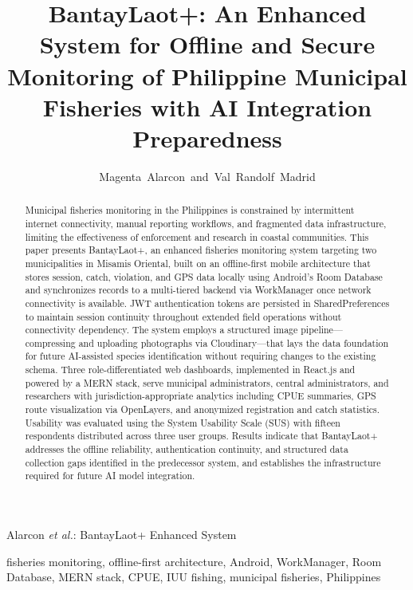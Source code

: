 \documentclass[journal]{IEEEtran}
\begin{document}
\title{BantayLaot+: An Enhanced System for Offline and Secure Monitoring of Philippine
Municipal Fisheries with AI Integration Preparedness}

\author{Magenta~Alarcon~and~Val~Randolf~Madrid}


%
{Alarcon \MakeLowercase{\textit{et al.}}: BantayLaot+ Enhanced System}

\maketitle

\begin{abstract}
Municipal fisheries monitoring in the Philippines is constrained by intermittent
internet connectivity, manual reporting workflows, and fragmented data infrastructure,
limiting the effectiveness of enforcement and research in coastal communities.
This paper presents BantayLaot+, an enhanced fisheries monitoring system targeting two
municipalities in Misamis Oriental, built on an offline-first mobile architecture that
stores session, catch, violation, and GPS data locally using Android's Room Database and
synchronizes records to a multi-tiered backend via WorkManager once network connectivity
is available. JWT authentication tokens are persisted in SharedPreferences to maintain
session continuity throughout extended field operations without connectivity dependency.
The system employs a structured image pipeline---compressing and uploading photographs
via Cloudinary---that lays the data foundation for future AI-assisted species
identification without requiring changes to the existing schema. Three
role-differentiated web dashboards, implemented in React.js and powered by a MERN
stack, serve municipal administrators, central administrators, and researchers with
jurisdiction-appropriate analytics including CPUE summaries, GPS route visualization
via OpenLayers, and anonymized registration and catch statistics. Usability was
evaluated using the System Usability Scale (SUS) with fifteen respondents distributed
across three user groups. Results indicate that BantayLaot+ addresses the offline
reliability, authentication continuity, and structured data collection gaps identified
in the predecessor system, and establishes the infrastructure required for future
AI model integration.
\end{abstract}

\begin{IEEEkeywords}
fisheries monitoring, offline-first architecture, Android, WorkManager, Room Database,
MERN stack, CPUE, IUU fishing, municipal fisheries, Philippines
\end{IEEEkeywords}
\end{document}
